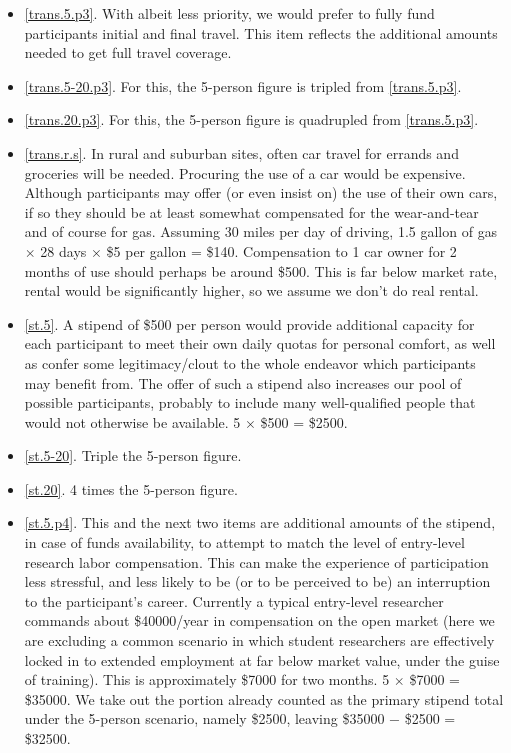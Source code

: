 \documentclass[10pt]{article}
\begin{document}
\begin{itemize}[leftmargin=*]
  \item[]{\ref{trans.5.p3}. With albeit less priority, we would prefer to fully fund participants initial and final travel. This item reflects the additional amounts needed to get full travel coverage.}
  \item[]{\ref{trans.5-20.p3}. For this, the 5-person figure is tripled from \ref{trans.5.p3}.}
  \item[]{\ref{trans.20.p3}. For this, the 5-person figure is quadrupled from \ref{trans.5.p3}.}
  \item[]{\ref{trans.r.s}. In rural and suburban sites, often car travel for errands and groceries will be needed. Procuring the use of a car would be expensive. Although participants may offer (or even insist on) the use of their own cars, if so they should be at least somewhat compensated for the wear-and-tear and of course for gas. Assuming 30 miles per day of driving, 1.5 gallon of gas $\times$ 28 days $\times$ \$5 per gallon = \$140. Compensation to 1 car owner for 2 months of use should perhaps be around \$500. This is far below market rate, rental would be significantly higher, so we assume we don't do real rental.}
  \item[]{\ref{st.5}. A stipend of \$500 per person would provide additional capacity for each participant to meet their own daily quotas for personal comfort, as well as confer some legitimacy/clout to the whole endeavor which participants may benefit from. The offer of such a stipend also increases our pool of possible participants, probably to include many well-qualified people that would not otherwise be available. 5 $\times$ \$500 = \$2500.}
  \item[]{\ref{st.5-20}. Triple the 5-person figure.}
  \item[]{\ref{st.20}. 4 times the 5-person figure.}
  \item[]{\ref{st.5.p4}. This and the next two items are additional amounts of the stipend, in case of funds availability, to attempt to match the level of entry-level research labor compensation. This can make the experience of participation less stressful, and less likely to be (or to be perceived to be) an interruption to the participant's career. Currently a typical entry-level researcher commands about \$40000/year in compensation on the open market (here we are excluding a common scenario in which student researchers are effectively locked in to extended employment at far below market value, under the guise of training). This is approximately \$7000 for two months. 5 $\times$ \$7000 = \$35000. We take out the portion already counted as the primary stipend total under the 5-person scenario, namely \$2500, leaving \$35000 $-$ \$2500 = \$32500.}

\end{itemize}
\end{document}
